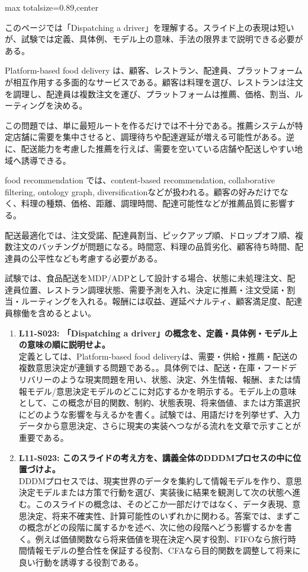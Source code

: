 \begin{minipage}[t]{0.58\textwidth}
\begin{adjustbox}{max totalsize={\textwidth}{0.89\textheight},center}
\begin{minipage}{\textwidth}\scriptsize
{}このページでは「Dispatching a driver」を理解する。スライド上の表現は短いが、試験では定義、具体例、モデル上の意味、手法の限界まで説明できる必要がある。\par
Platform-based food delivery は、顧客、レストラン、配達員、プラットフォームが相互作用する多面的なサービスである。顧客は料理を選び、レストランは注文を調理し、配達員は複数注文を運び、プラットフォームは推薦、価格、割当、ルーティングを決める。\par
この問題では、単に最短ルートを作るだけでは不十分である。推薦システムが特定店舗に需要を集中させると、調理待ちや配達遅延が増える可能性がある。逆に、配送能力を考慮した推薦を行えば、需要を空いている店舗や配送しやすい地域へ誘導できる。\par
food recommendation では、content-based recommendation, collaborative filtering, ontology graph, diversificationなどが扱われる。顧客の好みだけでなく、料理の種類、価格、距離、調理時間、配達可能性などが推薦品質に影響する。\par
配送最適化では、注文受諾、配達員割当、ピックアップ順、ドロップオフ順、複数注文のバッチングが問題になる。時間窓、料理の品質劣化、顧客待ち時間、配達員の公平性なども考慮する必要がある。\par
試験では、食品配送をMDP/ADPとして設計する場合、状態に未処理注文、配達員位置、レストラン調理状態、需要予測を入れ、決定に推薦・注文受諾・割当・ルーティングを入れる。報酬には収益、遅延ペナルティ、顧客満足度、配達員稼働を含めるとよい。\par{}\begin{enumerate}\item \textbf{L11-S023: 「Dispatching a driver」の概念を、定義・具体例・モデル上の意味の順に説明せよ。}\\定義としては、Platform-based food deliveryは、需要・供給・推薦・配送の複数意思決定が連鎖する問題である。。具体例では、配送・在庫・フードデリバリーのような現実問題を用い、状態、決定、外生情報、報酬、または情報モデル/意思決定モデルのどこに対応するかを明示する。モデル上の意味として、この概念が目的関数、制約、状態表現、将来価値、または方策選択にどのような影響を与えるかを書く。試験では、用語だけを列挙せず、入力データから意思決定、さらに現実の実装へつながる流れを文章で示すことが重要である。\item \textbf{L11-S023: このスライドの考え方を、講義全体のDDDMプロセスの中に位置づけよ。}\\DDDMプロセスでは、現実世界のデータを集約して情報モデルを作り、意思決定モデルまたは方策で行動を選び、実装後に結果を観測して次の状態へ進む。このスライドの概念は、そのどこか一部だけではなく、データ表現、意思決定、将来不確実性、計算可能性のいずれかに関わる。答案では、まずこの概念がどの段階に属するかを述べ、次に他の段階へどう影響するかを書く。例えば価値関数なら将来価値を現在決定へ戻す役割、FIFOなら旅行時間情報モデルの整合性を保証する役割、CFAなら目的関数を調整して将来に良い行動を誘導する役割である。\end{enumerate}

\end{minipage}
\end{adjustbox}
\end{minipage}

